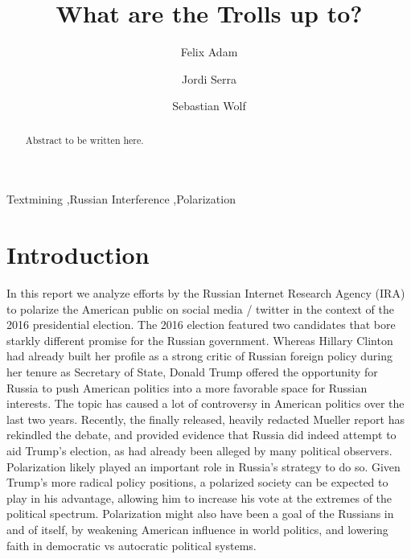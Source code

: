 \documentclass[12pt, authoryear]{elsarticle}
\begin{document}
\begin{frontmatter}  %

\title{What are the Trolls up to?}


\author[Add1]{Felix Adam}

\author[Add1]{Jordi Serra}

\author[Add1]{Sebastian Wolf}

\address[Add1]{Barcelona Graduate School of Economics, Barcelona, Spain}

\begin{abstract}
\small{
Abstract to be written here. 
}
\end{abstract}

\vspace{1cm}

\begin{keyword}
\footnotesize{
Textmining \sep Russian Interference \sep Polarization  \\ \vspace{0.3cm}
}
\end{keyword}
\vspace{0.5cm}
\end{frontmatter}

\headsep 35pt %
\section{Introduction}\label{intro}

In this report we analyze efforts by the Russian Internet Research Agency (IRA) to polarize the American public on social media / twitter in the context of the 2016 presidential election. The 2016 election featured two candidates that bore starkly different promise for the Russian government. Whereas Hillary Clinton had already built her profile as a strong critic of Russian foreign policy during her tenure as Secretary of State, Donald Trump offered the opportunity for Russia to push American politics into a more favorable space for Russian interests. The topic has caused a lot of controversy in American politics over the last two years. Recently, the finally released, heavily redacted Mueller report has rekindled the debate, and provided evidence that Russia did indeed attempt to aid Trump's election, as had already been alleged by many political observers. Polarization likely played an important role in Russia's strategy to do so. Given Trump's more radical policy positions, a polarized society can be expected to play in his advantage, allowing him to increase his vote at the extremes of the political spectrum. Polarization might also have been a goal of the Russians in and of itself, by weakening American influence in world politics, and lowering faith in democratic vs autocratic political systems.
\end{document}
